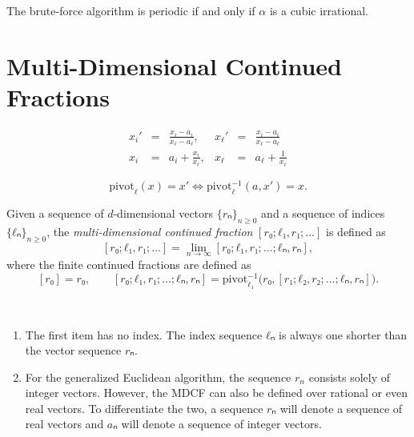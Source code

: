 \begin{conjecture}
  The brute-force algorithm is periodic if and only if $α$ is a cubic irrational.
\end{conjecture}

\section{Multi-Dimensional Continued Fractions}

\[
  \begin{array}{lcrlcr}
    \displaystyle x_i' & = & \displaystyle \frac{x_i - a_i}{x_ℓ - a_ℓ}, &
    \displaystyle x_ℓ' & = & \displaystyle \frac{x_i - a_i}{x_ℓ - a_ℓ} \\[1em]
    \displaystyle x_i & = & a_i + \displaystyle \frac{x_i}{x_ℓ}, &
    \displaystyle x_ℓ & = & a_ℓ + \displaystyle \frac{1}{x_ℓ}
  \end{array}
\]

\[
  \mathrm{pivot}_ℓ(x) = x' \iff \mathrm{pivot}_ℓ^{-1}(a, x') = x.
\]

\begin{definition}
  Given a sequence of $d$-dimensional vectors $\{rₙ\}_{n ≥ 0}$ and a sequence of
  indices $\{ℓₙ\}_{n ≥ 0}$, the \emph{multi-dimensional continued fraction} $[r₀; ℓ₁, r₁; …]$
  is defined as
  \[
    [r₀; ℓ₁, r₁; …] = \lim_{n → ∞} [r₀; ℓ₁, r₁; …; ℓₙ, rₙ],
  \]
  where the finite continued fractions are defined as
  \[
    [r₀] = r₀, \qquad [r₀; ℓ₁, r₁; …; ℓₙ, rₙ] = \mathrm{pivot}_{ℓ₁}^{-1}\big(r₀, [r₁; ℓ₂, r₂; …; ℓₙ, rₙ]\big).
  \]
\end{definition}

\begin{remark}~
  \begin{enumerate}
    \item
      The first item has no index.
      The index sequence $ℓₙ$ is always one shorter than the vector sequence $rₙ$.
    \item
      For the generalized Euclidean algorithm, the sequence $r_n$ consists solely of integer vectors.
      However, the MDCF can also be defined over rational or even real vectors.
      To differentiate the two, a sequence $rₙ$ will denote a sequence of real
      vectors and $aₙ$ will denote a sequence of integer vectors.
  \end{enumerate}
\end{remark}

